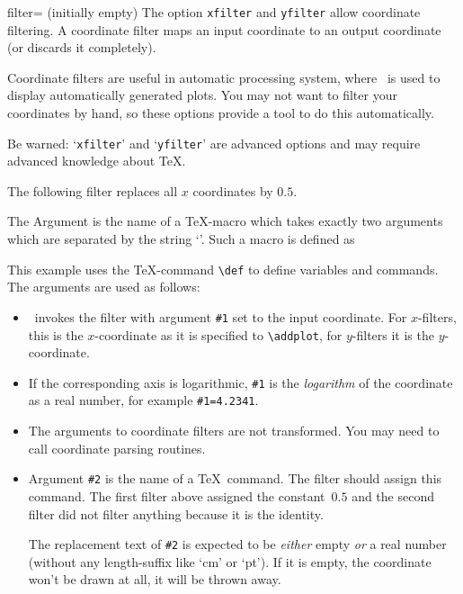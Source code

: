 \begin{pgfplotsxykey}{\x filter= (initially empty)}
The option \texttt{xfilter} and \texttt{yfilter} allow coordinate filtering. A coordinate filter maps an input coordinate to an output coordinate (or discards it completely).

Coordinate filters are useful in automatic processing system, where \PGFPlots\ is used to display automatically generated plots. You may not want to filter your coordinates by hand, so these options provide a tool to do this automatically.

Be warned: `\texttt{xfilter}' and `\texttt{yfilter}' are advanced options and may require advanced knowledge about \TeX.

The following filter replaces all $x$ coordinates by $0.5$.

The Argument  is the name of a \TeX-macro which takes exactly two arguments which are separated by the string `\texttt{\string\to}'. Such a macro is defined as
This example uses the \TeX-command \lstinline!\def! to define variables and commands. The arguments are used as follows:
\begin{itemize}
	\item \PGFPlots\ invokes the filter with argument \texttt{\#1} set to the input coordinate. For $x$-filters, this is the $x$-coordinate as it is specified to \lstinline!\addplot!, for $y$-filters it is the $y$-coordinate.
	\item If the corresponding axis is logarithmic, \texttt{\#1} is the \emph{logarithm} of the coordinate as a real number, for example \texttt{\#1=4.2341}.
	\item The arguments to coordinate filters are not transformed. You may need to call coordinate parsing routines.
	\item Argument \texttt{\#2} is the name of a \TeX\ command. The filter should assign this command. The first filter above assigned the constant~$0.5$ and the second filter did not filter anything because it is the identity.

	The replacement text of \texttt{\#2} is expected to be \emph{either} empty \emph{or} a real number (without any length-suffix like `cm' or `pt'). If it is empty, the coordinate won't be drawn at all, it will be thrown away.
\end{itemize}
\end{pgfplotsxykey}

